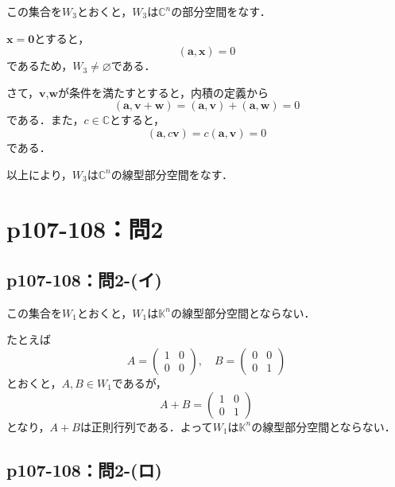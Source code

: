 \documentclass[a4paper,10pt,fleqn]{ltjsarticle}
\begin{document}
\begin{tleftbar}
    この集合を$W_3$とおくと，$W_3$は$\mathbb{C}^n$の部分空間をなす．

    $\bm{x}=\bm{0}$とすると，
    \[
        (\bm{a},\bm{x}) =0
    \]
    であるため，$W_3 \ne \varnothing$である．

    さて，$\bm{v}$,$\bm{w}$が条件を満たすとすると，内積の定義から
    \[
        (\bm{a},\bm{v}+\bm{w})=(\bm{a},\bm{v})+(\bm{a},\bm{w})=0
    \]
    である．また，$ c \in \mathbb{C}$とすると，
    \[
        (\bm{a},c\bm{v})=c(\bm{a},\bm{v})=0
    \]
    である．

    以上により，$W_3$は$\mathbb{C}^n$の線型部分空間をなす．
\end{tleftbar}


\section*{p107-108：問2}


\subsection*{p107-108：問2-(イ)}

\begin{tleftbar}この集合を$W_1$とおくと，$W_1$は$\mathbb{K}^n$の線型部分空間とならない．

    たとえば
    \[
        A = \begin{pmatrix} 1 & 0 \\ 0 & 0 \end{pmatrix},\quad B = \begin{pmatrix} 0 & 0 \\ 0 & 1 \end{pmatrix}
    \]
    とおくと，$ A , B \in W_1$であるが，
    \[
        A + B = \begin{pmatrix} 1 & 0 \\ 0 & 1 \end{pmatrix}
    \]
    となり，$A+B$は正則行列である．よって$W_1$は$\mathbb{K}^n$の線型部分空間とならない．
\end{tleftbar}


\subsection*{p107-108：問2-(ロ)}
\end{document}
